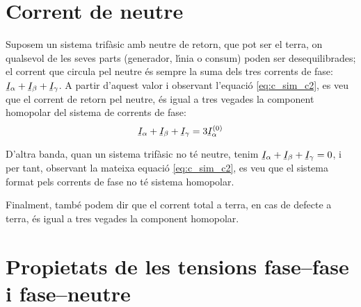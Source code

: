 \section{Corrent de neutre} 

Suposem un sistema trif\`{a}sic amb neutre de retorn, que pot ser el
terra, on qualsevol de les seves parts (generador, l\'{\i}nia o consum)
poden ser desequilibrades; el corrent que circula pel neutre \'{e}s
sempre la suma dels tres corrents de fase: $\cmplx{I}_\alpha+
\cmplx{I}_\beta+\cmplx{I}_\gamma$. A partir d'aquest valor i
observant l'equaci\'{o} \eqref{eq:c_sim_c2}, es veu que el corrent de
retorn pel neutre, \'{e}s igual a tres vegades la component homopolar
del sistema de corrents de fase:
\begin{equation}
    \cmplx{I}_\alpha+\cmplx{I}_\beta+\cmplx{I}_\gamma =3 \cmplx{I}_\alpha\ap{(0)}
\end{equation}

D'altra banda, quan un sistema trif\`{a}sic no t\'{e} neutre, tenim
$\cmplx{I}_\alpha+ \cmplx{I}_\beta+\cmplx{I}_\gamma=0$, i per tant,
observant la mateixa equaci\'{o} \eqref{eq:c_sim_c2}, es veu que el
sistema format pels corrents de fase no t\'{e} sistema homopolar.

Finalment, tamb\'{e} podem dir que el corrent total a terra, en cas de
defecte a terra, \'{e}s igual a tres vegades la component homopolar.

\section{Propietats de les tensions fase--fase i fase--neutre}
 

